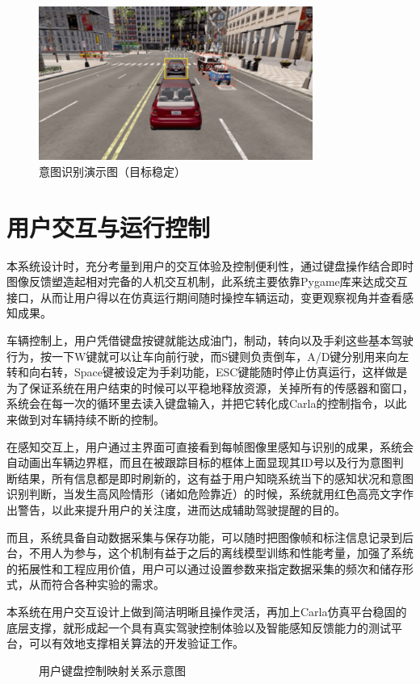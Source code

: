 \begin{figure}[H]
    \centering
    \includegraphics[width=0.8\textwidth]{images/图15 意图识别演示图（目标稳定）.pdf}  %
    \caption{意图识别演示图（目标稳定）}
    \label{fig:example_image}  %
\end{figure}

\section{用户交互与运行控制}

本系统设计时，充分考量到用户的交互体验及控制便利性，通过键盘操作结合即时图像反馈塑造起相对完备的人机交互机制，此系统主要依靠Pygame库来达成交互接口，从而让用户得以在仿真运行期间随时操控车辆运动，变更观察视角并查看感知成果。

车辆控制上，用户凭借键盘按键就能达成油门，制动，转向以及手刹这些基本驾驶行为，按一下W键就可以让车向前行驶，而S键则负责倒车，A/D键分别用来向左转和向右转，Space键被设定为手刹功能，ESC键能随时停止仿真运行，这样做是为了保证系统在用户结束的时候可以平稳地释放资源，关掉所有的传感器和窗口，系统会在每一次的循环里去读入键盘输入，并把它转化成Carla的控制指令，以此来做到对车辆持续不断的控制。

在感知交互上，用户通过主界面可直接看到每帧图像里感知与识别的成果，系统会自动画出车辆边界框，而且在被跟踪目标的框体上面显现其ID号以及行为意图判断结果，所有信息都是即时刷新的，这有益于用户知晓系统当下的感知状况和意图识别判断，当发生高风险情形（诸如危险靠近）的时候，系统就用红色高亮文字作出警告，以此来提升用户的关注度，进而达成辅助驾驶提醒的目的。

而且，系统具备自动数据采集与保存功能，可以随时把图像帧和标注信息记录到后台，不用人为参与，这个机制有益于之后的离线模型训练和性能考量，加强了系统的拓展性和工程应用价值，用户可以通过设置参数来指定数据采集的频次和储存形式，从而符合各种实验的需求。

本系统在用户交互设计上做到简洁明晰且操作灵活，再加上Carla仿真平台稳固的底层支撑，就形成起一个具有真实驾驶控制体验以及智能感知反馈能力的测试平台，可以有效地支撑相关算法的开发验证工作。


\begin{figure}[H]
	\centering
	\caption{用户键盘控制映射关系示意图}
	\label{fig:example_image}
\end{figure}


\begin{tabular}{l l}
\end{tabular}
